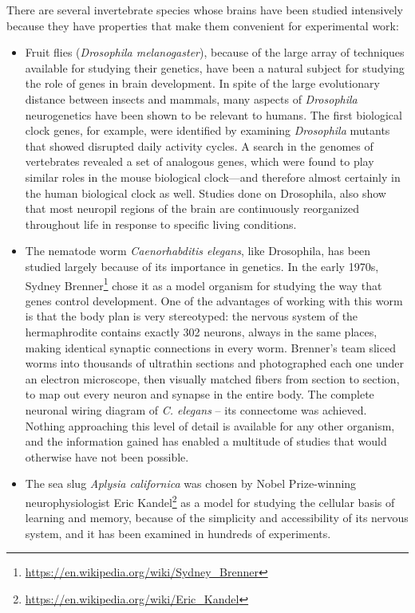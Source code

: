 \documentclass[]{book}
\providecommand{\tightlist}{%
  \setlength{\itemsep}{0pt}\setlength{\parskip}{0pt}}
\let\rmarkdownfootnote\footnote%
\def\footnote{\protect\rmarkdownfootnote}
\renewcommand{\href}[2]{#2\footnote{\url{#1}}}
\begin{document}
There are several invertebrate species whose brains have been studied intensively because they have properties that make them convenient for experimental work:

\begin{itemize}
\tightlist
\item
  Fruit flies (\emph{Drosophila melanogaster}), because of the large array of techniques available for studying their genetics, have been a natural subject for studying the role of genes in brain development. In spite of the large evolutionary distance between insects and mammals, many aspects of \emph{Drosophila} neurogenetics have been shown to be relevant to humans. The first biological clock genes, for example, were identified by examining \emph{Drosophila} mutants that showed disrupted daily activity cycles. A search in the genomes of vertebrates revealed a set of analogous genes, which were found to play similar roles in the mouse biological clock---and therefore almost certainly in the human biological clock as well. Studies done on Drosophila, also show that most neuropil regions of the brain are continuously reorganized throughout life in response to specific living conditions.
\item
  The nematode worm \emph{Caenorhabditis elegans}, like Drosophila, has been studied largely because of its importance in genetics. In the early 1970s, \href{https://en.wikipedia.org/wiki/Sydney_Brenner}{Sydney Brenner} chose it as a model organism for studying the way that genes control development. One of the advantages of working with this worm is that the body plan is very stereotyped: the nervous system of the hermaphrodite contains exactly 302 neurons, always in the same places, making identical synaptic connections in every worm. Brenner's team sliced worms into thousands of ultrathin sections and photographed each one under an electron microscope, then visually matched fibers from section to section, to map out every neuron and synapse in the entire body. The complete neuronal wiring diagram of \emph{C. elegans} -- its connectome was achieved. Nothing approaching this level of detail is available for any other organism, and the information gained has enabled a multitude of studies that would otherwise have not been possible.
\item
  The sea slug \emph{Aplysia californica} was chosen by Nobel Prize-winning neurophysiologist \href{https://en.wikipedia.org/wiki/Eric_Kandel}{Eric Kandel} as a model for studying the cellular basis of learning and memory, because of the simplicity and accessibility of its nervous system, and it has been examined in hundreds of experiments.
\end{itemize}
\end{document}
